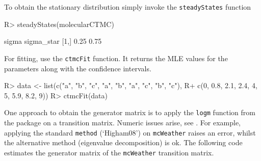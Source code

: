 \documentclass[article,nojss]{jss}
\begin{document}
To obtain the stationary distribution simply invoke the \texttt{steadyStates} function

\begin{CodeChunk}

\begin{CodeInput}
R> steadyStates(molecularCTMC)
\end{CodeInput}

\begin{CodeOutput}
     sigma sigma_star
[1,]  0.25       0.75
\end{CodeOutput}
\end{CodeChunk}

For fitting, use the \texttt{ctmcFit} function. It returns the MLE values for the parameters along with the confidence intervals.

\begin{CodeChunk}

\begin{CodeInput}
R> data <- list(c("a", "b", "c", "a", "b", "a", "c", "b", "c"), 
R+              c(0, 0.8, 2.1, 2.4, 4, 5, 5.9, 8.2, 9))
R> ctmcFit(data)
\end{CodeInput}

\end{CodeChunk}

One approach to obtain the generator matrix is to apply the \texttt{logm} function from the  package on a transition matrix. Numeric issues arise, see \cite{israel2001finding}. For example, applying the standard \texttt{method} (`Higham08') on \texttt{mcWeather} raises an error, whilst the alternative method (eigenvalue decomposition) is ok. The following code estimates the generator matrix of the \texttt{mcWeather} transition matrix.
\end{document}
